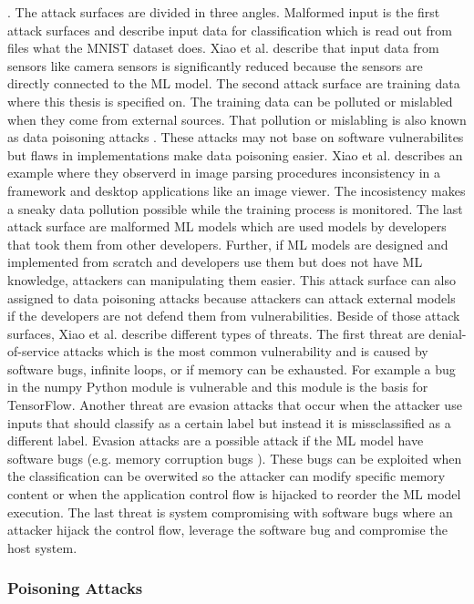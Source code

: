 \cite{lecun_cortes_burges_2017}. The attack surfaces are divided in three angles. Malformed input is the first attack surfaces and describe input data for classification which is read out from files what the MNIST dataset does. Xiao et al. describe that input data from sensors like camera sensors is significantly reduced because the sensors are directly connected to the ML model. The second attack surface are training data where this thesis is specified on. The training data can be polluted or mislabled when they come from external sources. That pollution or mislabling is also known as data poisoning attacks \cite{DBLP:conf/icml/BiggioNL12}. These attacks may not base on software vulnerabilites but flaws in implementations make data poisoning easier. Xiao et al. describes an example where they observerd in image parsing procedures inconsistency in a framework and desktop applications like an image viewer. The incosistency makes a sneaky data pollution possible while the training process is monitored. The last attack surface are malformed ML models which are used models by developers that took them from other developers. Further, if ML models are designed and implemented from scratch and developers use them but does not have ML knowledge, attackers can manipulating them easier. This attack surface can also assigned to data poisoning attacks because attackers can attack external models if the developers are not defend them from vulnerabilities. Beside of those attack surfaces, Xiao et al. describe different types of threats. The first threat are denial-of-service attacks which is the most common vulnerability and is caused by software bugs, infinite loops, or if memory can be exhausted. For example a bug in the numpy Python module is vulnerable and this module is the basis for TensorFlow. Another threat are evasion attacks that occur when the attacker use inputs that should classify as a certain label but instead it is missclassified as a different label. Evasion attacks are a possible attack if the ML model have software bugs (e.g. memory corruption bugs \cite{DBLP:conf/mipro/Novkovic21}). These bugs can be exploited when the classification can be overwited so the attacker can modify specific memory content or when the application control flow is hijacked to reorder the ML model execution. The last threat is system compromising with software bugs where an attacker hijack the control flow, leverage the software bug and compromise the host system.

\subsubsection*{Poisoning Attacks}

